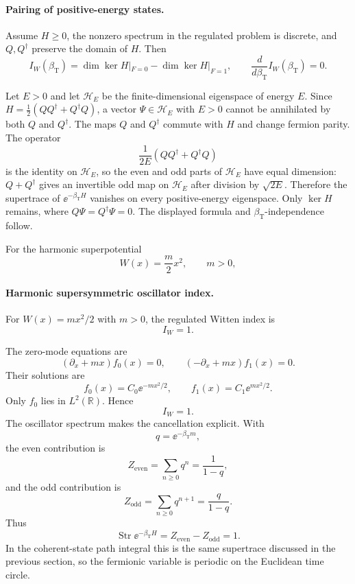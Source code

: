 \paragraph{Pairing of positive-energy states.}
Assume \(H\ge0\), the nonzero spectrum in the regulated problem is discrete,
and \(Q,Q^\dagger\) preserve the domain of \(H\).  Then
\[
  I_W(\beta_{\mathrm T})
  =
  \dim\ker H|_{F=0}-\dim\ker H|_{F=1},
  \qquad
  \frac{d}{d\beta_{\mathrm T}}I_W(\beta_{\mathrm T})=0 .
\]

Let \(E>0\) and let \(\mathcal H_E\) be the finite-dimensional eigenspace of
energy \(E\).  Since \(H=\frac12(QQ^\dagger+Q^\dagger Q)\),
a vector \(\Psi\in\mathcal H_E\) with \(E>0\) cannot be annihilated by both
\(Q\) and \(Q^\dagger\).  The maps \(Q\) and \(Q^\dagger\) commute with \(H\)
and change fermion parity.  The operator
\[
  \frac{1}{2E}(QQ^\dagger+Q^\dagger Q)
\]
is the identity on \(\mathcal H_E\), so the even and odd parts of
\(\mathcal H_E\) have equal dimension: \(Q+Q^\dagger\) gives an invertible
odd map on \(\mathcal H_E\) after division by \(\sqrt{2E}\).  Therefore the
supertrace of \(\ee^{-\beta_{\mathrm T}H}\) vanishes on every
positive-energy eigenspace.  Only \(\ker H\) remains, where
\(Q\Psi=Q^\dagger\Psi=0\).  The displayed formula and
\(\beta_{\mathrm T}\)-independence follow.

For the harmonic superpotential
\[
  W(x)=\frac{m}{2}x^2,\qquad m>0,
\]
\paragraph{Harmonic supersymmetric oscillator index.}
For \(W(x)=mx^2/2\) with \(m>0\), the regulated Witten index is
\[
  I_W=1.
\]

The zero-mode equations are
\[
  (\partial_x+mx)f_0(x)=0,
  \qquad
  (-\partial_x+mx)f_1(x)=0.
\]
Their solutions are
\[
  f_0(x)=C_0\ee^{-mx^2/2},
  \qquad
  f_1(x)=C_1\ee^{mx^2/2}.
\]
Only \(f_0\) lies in \(L^2(\mathbb R)\).  Hence
\[
  I_W=1 .
\]
The oscillator spectrum makes the cancellation explicit.  With
\[
  q=\ee^{-\beta_{\mathrm T}m},
\]
the even contribution is
\[
  Z_{\mathrm{even}}=\sum_{n\ge0}q^n=\frac1{1-q},
\]
and the odd contribution is
\[
  Z_{\mathrm{odd}}=\sum_{n\ge0}q^{n+1}=\frac{q}{1-q}.
\]
Thus
\[
  \operatorname{Str}\ee^{-\beta_{\mathrm T}H}
  =
  Z_{\mathrm{even}}-Z_{\mathrm{odd}}=1.
\]
In the coherent-state path integral this is the same supertrace discussed in
the previous section, so the fermionic variable is periodic on the Euclidean
time circle.

